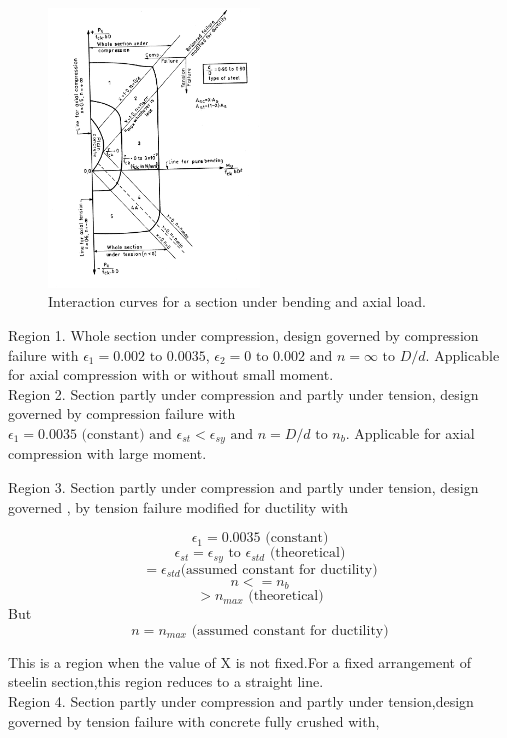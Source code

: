 \begin{figure}
\centering
\includegraphics[width=0.5\textwidth]{images/exported.png}
\caption{Interaction curves for a section under bending and axial load.}
\label{fig:exported}
\end{figure}

Region 1. Whole section under compression, design governed by compression
failure with $\epsilon_1=0.002 \text{ to } 0.0035$, $\epsilon_2=0
\text{ to } 0.002 \text{ and } n=\infty \text{ to } D/d.$
Applicable for axial compression with or without small moment.\\

Region 2. Section partly under compression and partly under tension,
design governed by compression failure with
$\epsilon_1 = 0.0035 \text{ (constant) and } \epsilon_{st} < \epsilon_{sy}
\text{ and } n = D/d \text{ to } n_b.$ Applicable for axial compression with large
moment.

Region 3. Section partly under compression and partly under tension,
design governed , by tension failure modiﬁed for ductility with

$$\epsilon_1 = 0.0035 \text{ (constant)}$$
$$\epsilon_{st} =\epsilon_{sy} \text{ to } \epsilon_{std}
\text{ (theoretical)}$$
$$=\epsilon_{std} \text{(assumed constant for ductility)}$$
$$n<= n_b$$
$$>n_{max} \text{ (theoretical)}$$
But $$n=n_{max} \text{ (assumed constant for ductility)}$$

This is a region when the value of X is not ﬁxed.For a ﬁxed arrangement
of steelin section,this region reduces to a straight line. \\

Region 4. Section partly under compression and partly under tension,design
governed by tension failure with concrete fully crushed with,


